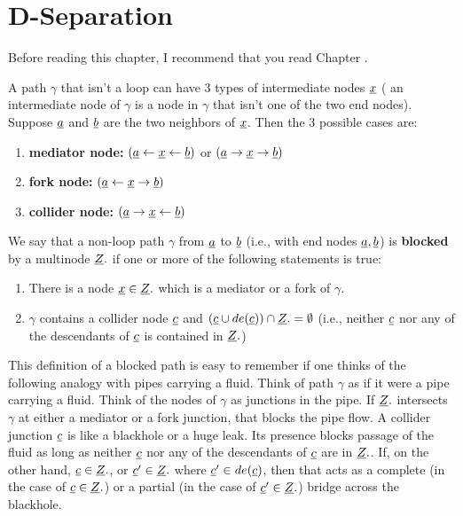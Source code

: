 \chapter{D-Separation}
\label{ch-dsep}
Before reading this chapter,
I  recommend
that you
read
Chapter .


A path $\gamma$ that
isn't a loop can have 
3 types of intermediate nodes ${\underline{x}}$ (
an intermediate node of $\gamma$
 is a node in $\gamma$ that 
isn't one
of the two end nodes).
Suppose ${\underline{a}}$ and ${\underline{b}}$
are the two neighbors of ${\underline{x}}$. Then
the 3 possible cases are:
\begin{enumerate}
\item {\bf mediator node:}
$({\underline{a}}\leftarrow{\underline{x}}\leftarrow {\underline{b}})$
or
$({\underline{a}}\rightarrow{\underline{x}}\rightarrow {\underline{b}})$
\item {\bf fork node:}
$({\underline{a}}\leftarrow{\underline{x}}\rightarrow {\underline{b}})$
\item {\bf collider node:}
$({\underline{a}}\rightarrow{\underline{x}}\leftarrow {\underline{b}})$
\end{enumerate}

We say that a non-loop path 
$\gamma$ 
from ${\underline{a}}$ to ${\underline{b}}$ (i.e., with
end nodes ${\underline{a}}, {\underline{b}}$)
is {\bf blocked}
by a multinode ${\underline{Z}}.$
if one or more 
of the following
statements is true:

\begin{enumerate}
\item 
There is a node ${\underline{x}}\in {\underline{Z}}.$
which is a mediator 
or a fork of $\gamma$.
\item
$\gamma$ contains a collider
node ${\underline{c}}$
and 
$({\underline{c}}\cup de({\underline{c}}))\cap{\underline{Z}}.=\emptyset$
(i.e., neither 
${\underline{c}}$ nor 
any of the descendants of ${\underline{c}}$
is contained in ${\underline{Z}}.$)
\end{enumerate}

This definition of a blocked 
path is easy to remember
if one thinks 
of the following analogy
with pipes carrying a fluid.
Think of path
$\gamma$ as if it
were a pipe
carrying a fluid.
Think of
the nodes 
of $\gamma$ as junctions in the pipe.
If ${\underline{Z}}.$
intersects $\gamma$
at either a mediator
or a fork junction,
that blocks the pipe flow.
A collider junction ${\underline{c}}$
is like a blackhole 
or a huge leak.
Its presence
blocks passage
of the fluid
as long
as neither
${\underline{c}}$
nor any of
the descendants 
of ${\underline{c}}$
are in ${\underline{Z}}.$.
If,
on the 
other hand,
${\underline{c}}\in{\underline{Z}}.$,
or ${\underline{c}}'\in {\underline{Z}}.$
where ${\underline{c}}'\in de({\underline{c}})$,
then
that acts
as a complete
(in the case of ${\underline{c}}\in{\underline{Z}}.$)
or a partial 
(in the case of ${\underline{c}}'\in{\underline{Z}}.$)
bridge across the blackhole.

